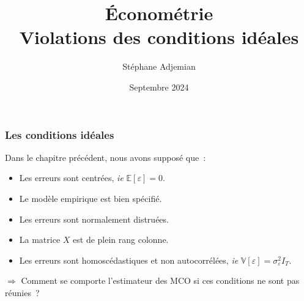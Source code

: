 \documentclass[10pt]{beamer}
\newcommand{\epsvar}{\sigma_{\varepsilon}^2}
\theoremstyle{plain}
\begin{document}
\title{Économétrie\\\small{Violations des conditions idéales}}
\author[S. Adjemian]{Stéphane Adjemian}
\date{Septembre 2024}

\begin{frame}
  \titlepage{}
\end{frame}


\begin{frame}
  \frametitle{Les conditions idéales}

  Dans le chapitre précédent, nous avons supposé que~:\newline

  \medskip

  \begin{itemize}

  \item Les erreurs sont centrées, \textit{ie} $\mathbb E[\varepsilon]=0$.\newline

  \item Le modèle empirique est bien spécifié.\newline

  \item Les erreurs sont normalement distruées.\newline

  \item La matrice $X$ est de plein rang colonne.\newline

  \item Les erreurs sont homoscédastiques et non autocorrélées, \textit{ie}  $\mathbb V[\varepsilon] = \epsvar I_T$.\newline

  \end{itemize}

  \medskip

  $\Rightarrow$ Comment se comporte l'estimateur des MCO si ces conditions ne sont pas réunies~?

\end{frame}
\end{document}
